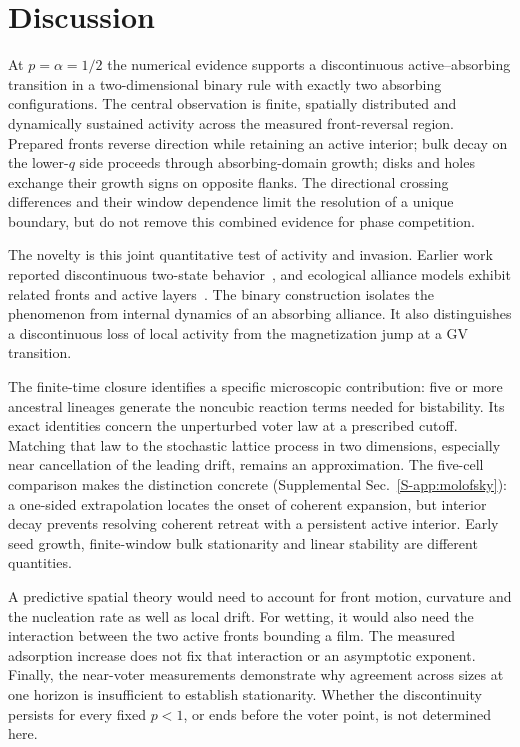 \section{Discussion}
\label{sec:discussion}

At $p=\alpha=1/2$ the numerical evidence supports a discontinuous
active--absorbing transition in a two-dimensional binary rule with
exactly two absorbing configurations. The central observation is
finite, spatially distributed and dynamically sustained activity
across the measured front-reversal region. Prepared fronts reverse
direction while retaining an active interior; bulk decay on the
lower-$q$ side proceeds through absorbing-domain growth; disks and holes
exchange their growth signs on opposite flanks.
The directional crossing differences and their window dependence
limit the resolution of a unique boundary, but do not remove this
combined evidence for phase competition.

The novelty is this joint quantitative test of activity and invasion.
Earlier work reported discontinuous two-state behavior~\cite{rodrigues2015},
and ecological alliance models exhibit related fronts and active
layers~\cite{szabo2004,guisoni2013}. The binary construction isolates
the phenomenon from internal dynamics of an absorbing alliance.
It also distinguishes a discontinuous loss of local activity from
the magnetization jump at a GV transition.

The finite-time closure identifies a specific microscopic contribution:
five or more ancestral lineages generate the noncubic reaction terms
needed for bistability. Its exact identities concern the unperturbed
voter law at a prescribed cutoff. Matching that law to the stochastic
lattice process in two dimensions, especially near cancellation of the
leading drift, remains an approximation. The five-cell comparison
makes the distinction concrete (Supplemental Sec.~\ref{S-app:molofsky}):
a one-sided extrapolation locates the onset of coherent expansion,
but interior decay prevents resolving coherent retreat with a persistent
active interior.
Early seed growth, finite-window bulk stationarity and linear stability
are different quantities.

A predictive spatial theory would need to account for front motion,
curvature and the nucleation rate as well as local drift.
For wetting, it would also need the interaction between the two active
fronts bounding a film. The measured adsorption increase does not fix
that interaction or an asymptotic exponent.
Finally, the near-voter measurements demonstrate why agreement across
sizes at one horizon is insufficient to establish stationarity.
Whether the discontinuity persists for every fixed $p<1$, or ends
before the voter point, is not determined here.
